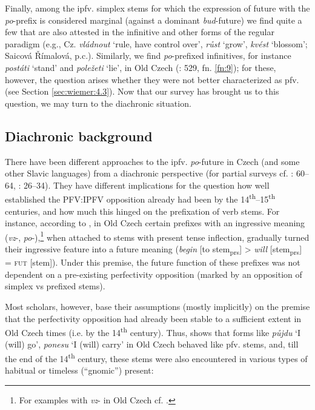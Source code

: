 \documentclass[output=paper,colorlinks,citecolor=brown]{langscibook}
\begin{document}
\largerpage[1.5]

Finally, among the ipfv. simplex stems for which the expression of future with the \textit{po}-prefix is considered marginal (against a dominant \textit{bud}-future) we find quite a few that are also attested in the infinitive and other forms of the regular paradigm (e.g., Cz. \textit{vládnout} ‘rule, have control over’, \textit{růst} ‘grow’,\textit{ kvést} ‘blossom’; Saicová Římalová, p.c.). Similarly, we find \textit{po}-prefixed infinitives, for instance \textit{postáti }‘stand’ and\textit{ poležeti} ‘lie’, in Old Czech (\cite{Bondarko1961}: 529, fn. \ref{fn:9}); for these, however, the question arises whether they were not better characterized as pfv. (see Section \ref{sec:wiemer:4.3}). Now that our survey has brought us to this question, we may turn to the diachronic situation.

\subsection{Diachronic background}\label{sec:wiemer:4.2}

There have been different approaches to the ipfv. \textit{po}-future in Czech (and some other Slavic languages) from a diachronic perspective (for partial surveys cf. \cite{Mrhačová1993}: 60--64, \cite{Bláha2008}: 26--34). They have different implications for the question how well established the PFV:IPFV opposition already had been by the 14\textsuperscript{th}--15\textsuperscript{th} centuries, and how much this hinged on the prefixation of verb stems. For instance, according to \citet{LamprechtBauer1986}, in Old Czech certain prefixes with an ingressive meaning (\textit{vz}-, \textit{po}-),\footnote{For examples with \textit{vz}- in Old Czech cf. \citet[192]{Trávníček1923}.} when attached to stems with present tense inflection, gradually turned their ingressive feature into a future meaning (\textit{begin} [to stem\textsubscript{prs}] > \textit{will} [stem\textsubscript{prs}] = \textsc{fut} [stem]). Under this premise, the future function of these prefixes was not dependent on a pre-existing perfectivity opposition (marked by an opposition of simplex vs prefixed stems).

Most scholars, however, base their assumptions (mostly implicitly) on the premise that the perfectivity opposition had already been stable to a sufficient extent in Old Czech times (i.e. by the 14\textsuperscript{th} century). Thus, \citet{Bondarko1961} shows that forms like \textit{půjdu }‘I (will) go’, \textit{ponesu }‘I (will) carry’ in Old Czech behaved like pfv. stems, and, till the end of the 14\textsuperscript{th} century, these stems were also encountered in various types of habitual or timeless (“gnomic”) present:
\end{document}
